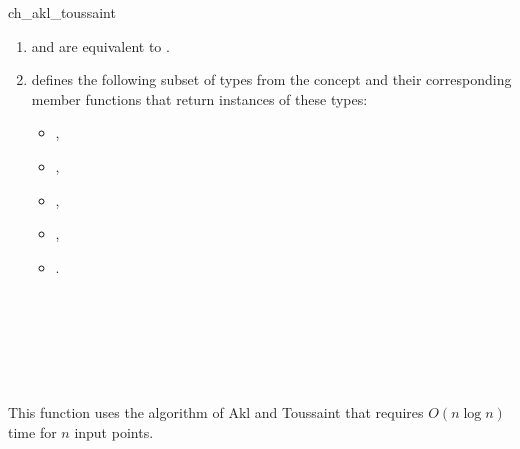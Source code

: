 \begin{ccRefFunction}{ch_akl_toussaint}
\begin{enumerate}
   \item    {} and 
            are equivalent to .
   \item    {} defines the following subset of types from
            the concept  and their corresponding member
            functions that return instances of these types:
            \begin{itemize}
                \item {},
                \item {}, 
                \item {},
                \item {},
                \item {}.
            \end{itemize}
\end{enumerate}


\ccSeeAlso

 \\
 \\
 \\
 \\
 \\

\ccImplementation

This function uses the algorithm of Akl and
Toussaint \cite{at-fcha-78} that requires $O(n \log n)$ time for $n$ input
points.  

\end{ccRefFunction}


